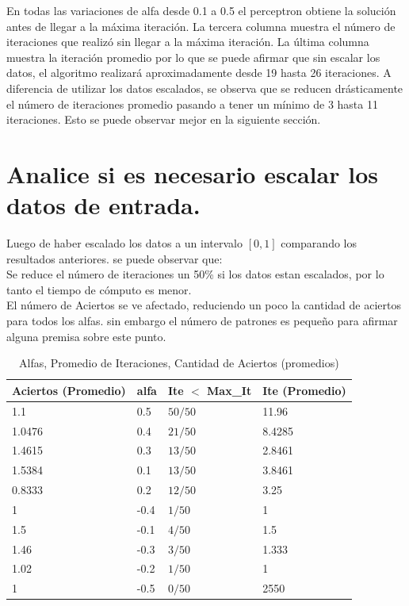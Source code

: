\documentclass[8.5pt,twoside,twocolumn]{article}
\begin{document}
        En todas las variaciones de alfa desde 0.1 a 0.5 el perceptron obtiene la soluci\'on antes de llegar a la m\'axima iteraci\'on. 
        La tercera columna muestra el n\'umero de iteraciones que realiz\'o sin llegar a la m\'axima iteraci\'on.
        La \'ultima columna muestra la iteraci\'on promedio por lo que se puede afirmar que sin escalar los datos, el algoritmo realizar\'a
aproximadamente desde 19 hasta 26 iteraciones. A diferencia de utilizar los datos escalados,  se observa que se reducen dr\'asticamente el n\'umero 
de iteraciones promedio pasando a tener un m\'inimo de 3 hasta 11 iteraciones. Esto se puede observar mejor en la siguiente secci\'on. 

       
 \section{Analice si es necesario escalar los datos de entrada.}
    Luego de haber escalado los datos a un intervalo $[0,1]$ comparando los resultados anteriores.  se puede observar que:
    \\ Se reduce el n\'umero de iteraciones un 50\% si los datos estan escalados, por lo tanto el tiempo de c\'omputo es menor. 
    \\ El n\'umero de Aciertos se ve afectado, reduciendo un poco la cantidad de aciertos para todos los alfas. 
sin embargo el n\'umero de patrones es peque\~no para afirmar alguna premisa sobre este punto.

        \begin{table}[h]
        \small
        \caption{ Alfas, Promedio de Iteraciones, Cantidad de Aciertos (promedios) }
        \label{tbl:example}
        \begin{tabular*}{0.5\textwidth}{@{\extracolsep{\fill}}llll}
        \hline
        Aciertos (Promedio) & alfa & Ite $<$ Max\_It & Ite (Promedio)\\
        \hline
        1.1  & 0.5 & $50/50$ & 11.96 \\
        1.0476  & 0.4& $21/50$ & 8.4285  \\
        1.4615 & 0.3 & $13/50$ & 2.8461 \\
        1.5384 & 0.1 & $13/50$ & 3.8461 \\
        0.8333 & 0.2 & $12/50$ & 3.25 \\
        1 & -0.4 & $1/50$ & 1 \\
        1.5 & -0.1 & $4/50$ & 1.5 \\
        1.46 & -0.3 & $3/50$ & 1.333 \\
        1.02 & -0.2 & $1/50$ & 1 \\
        1 & -0.5 & $0/50$ & 2550 \\
        \hline
        \end{tabular*}
        \end{table}
\end{document}
